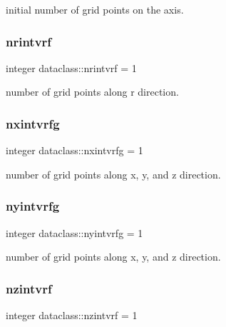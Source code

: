 initial number of grid points on the axis. 

\mbox{\label{namespacedataclass_a3b9a2feb5ab8139d532626cad00a9769}} 
\subsubsection{\texorpdfstring{nrintvrf}{nrintvrf}}
{\footnotesize\ttfamily integer dataclass\+::nrintvrf = 1}



number of grid points along r direction. 

\mbox{\label{namespacedataclass_a6302bc97206196f7003db67abd75507e}} 
\subsubsection{\texorpdfstring{nxintvrfg}{nxintvrfg}}
{\footnotesize\ttfamily integer dataclass\+::nxintvrfg = 1}



number of grid points along x, y, and z direction. 

\mbox{\label{namespacedataclass_a32c01f4c7d58343edc8d318b2e5f4760}} 
\subsubsection{\texorpdfstring{nyintvrfg}{nyintvrfg}}
{\footnotesize\ttfamily integer dataclass\+::nyintvrfg = 1}



number of grid points along x, y, and z direction. 

\mbox{\label{namespacedataclass_a7dee8b652907c73253c32891a2a08514}} 
\subsubsection{\texorpdfstring{nzintvrf}{nzintvrf}}
{\footnotesize\ttfamily integer dataclass\+::nzintvrf = 1}



